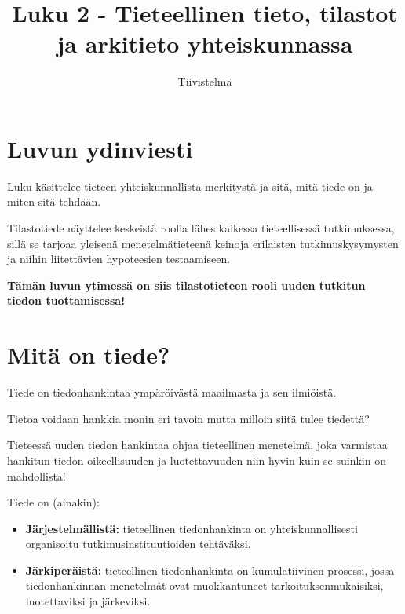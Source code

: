 \documentclass[
]{report}
\title{Luku 2 - Tieteellinen tieto, tilastot ja arkitieto
yhteiskunnassa}
\subtitle{Tiivistelmä}
\author{}
\date{}
\begin{document}
\maketitle
\ifdefined\Shaded\renewenvironment{Shaded}{\begin{tcolorbox}[enhanced, boxrule=0pt, frame hidden, interior hidden, breakable, sharp corners, borderline west={3pt}{0pt}{shadecolor}]}{\end{tcolorbox}}\fi

\hypertarget{luvun-ydinviesti}{%
\section{Luvun ydinviesti}\label{luvun-ydinviesti}}

Luku käsittelee tieteen yhteiskunnallista merkitystä ja sitä, mitä tiede
on ja miten sitä tehdään.

Tilastotiede näyttelee keskeistä roolia lähes kaikessa tieteellisessä
tutkimuksessa, sillä se tarjoaa yleisenä menetelmätieteenä keinoja
erilaisten tutkimuskysymysten ja niihin liitettävien hypoteesien
testaamiseen.

\textbf{Tämän luvun ytimessä on siis tilastotieteen rooli uuden tutkitun
tiedon tuottamisessa!}

\hypertarget{mituxe4-on-tiede}{%
\section{Mitä on tiede?}\label{mituxe4-on-tiede}}

Tiede on tiedonhankintaa ympäröivästä maailmasta ja sen ilmiöistä.

Tietoa voidaan hankkia monin eri tavoin mutta milloin siitä tulee
tiedettä?

Tieteessä uuden tiedon hankintaa ohjaa tieteellinen menetelmä, joka
varmistaa hankitun tiedon oikeellisuuden ja luotettavuuden niin hyvin
kuin se suinkin on mahdollista!

Tiede on (ainakin):

\begin{itemize}
\item
  \textbf{Järjestelmällistä:} tieteellinen tiedonhankinta on
  yhteiskunnallisesti organisoitu tutkimusinstituutioiden tehtäväksi.
\item
  \textbf{Järkiperäistä:} tieteellinen tiedonhankinta on kumulatiivinen
  prosessi, jossa tiedonhankinnan menetelmät ovat muokkantuneet
  tarkoituksenmukaisiksi, luotettaviksi ja järkeviksi.
\end{itemize}
\end{document}
